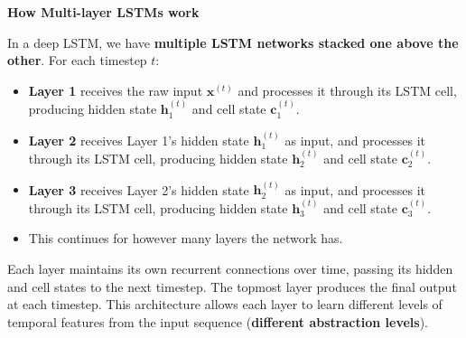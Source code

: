 \begin{flushleft}
    \textcolor{Green3}{ \textbf{How Multi-layer LSTMs work}}
\end{flushleft}
In a deep LSTM, we have \textbf{multiple LSTM networks stacked one above the other}. For each timestep $t$:
\begin{itemize}
    \item \textbf{Layer 1} receives the raw input $\mathbf{x}^{(t)}$ and processes it through its LSTM cell, producing hidden state $\mathbf{h}_1^{(t)}$ and cell state $\mathbf{c}_1^{(t)}$.
    \item \textbf{Layer 2} receives Layer 1's hidden state $\mathbf{h}_1^{(t)}$ as input, and processes it through its LSTM cell, producing hidden state $\mathbf{h}_2^{(t)}$ and cell state $\mathbf{c}_2^{(t)}$.
    \item \textbf{Layer 3} receives Layer 2's hidden state $\mathbf{h}_2^{(t)}$ as input, and processes it through its LSTM cell, producing hidden state $\mathbf{h}_3^{(t)}$ and cell state $\mathbf{c}_3^{(t)}$.
    \item This continues for however many layers the network has.
\end{itemize}
Each layer maintains its own recurrent connections over time, passing its hidden and cell states to the next timestep. The topmost layer produces the final output at each timestep. This architecture allows each layer to learn different levels of temporal features from the input sequence (\textbf{different abstraction levels}).

